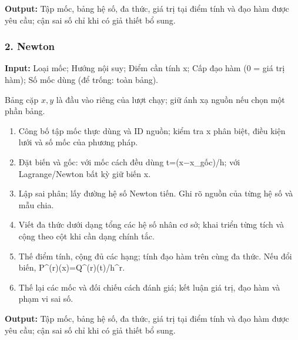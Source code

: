\textbf{Output:} Tập mốc,\allowbreak{} bảng hệ số,\allowbreak{} đa thức,\allowbreak{} giá trị tại điểm tính và đạo hàm được yêu cầu;\allowbreak{} cận sai số chỉ khi có giả thiết bổ sung.

\examplebreak\subsubsection*{2. Newton}

\textbf{Input:} Loại mốc;\allowbreak{} Hướng nội suy;\allowbreak{} Điểm cần tính x;\allowbreak{} Cấp đạo hàm (\allowbreak{}0 =\allowbreak{} giá trị hàm);\allowbreak{} Số mốc dùng (\allowbreak{}để trống: toàn bảng).

Bảng cặp $x,y$ là đầu vào riêng của lượt chạy; giữ ánh xạ nguồn nếu chọn một phần bảng.

\begin{enumerate}

\item Công bố tập mốc thực dùng và ID nguồn;\allowbreak{} kiểm tra x phân biệt,\allowbreak{} điều kiện lưới và số mốc của phương pháp.

\item Đặt biến và gốc: với mốc cách đều dùng t=\allowbreak{}(\allowbreak{}x\ensuremath{-}x\_gốc)/\allowbreak{}h;\allowbreak{} với Lagrange/\allowbreak{}Newton bất kỳ giữ biến x.

\item Lập sai phân;\allowbreak{} lấy đường hệ số Newton tiến. Ghi rõ nguồn của từng hệ số và mẫu chia.

\item Viết đa thức dưới dạng tổng các hệ số nhân cơ sở;\allowbreak{} khai triển từng tích và cộng theo cột khi cần dạng chính tắc.

\item Thế điểm tính,\allowbreak{} cộng đủ các hạng;\allowbreak{} tính đạo hàm trên cùng đa thức. Nếu đổi biến,\allowbreak{} P\textasciicircum{}(\allowbreak{}r)(\allowbreak{}x)=\allowbreak{}Q\textasciicircum{}(\allowbreak{}r)(\allowbreak{}t)/\allowbreak{}h\textasciicircum{}r.

\item Thế lại các mốc và đối chiếu cách đánh giá;\allowbreak{} kết luận giá trị,\allowbreak{} đạo hàm và phạm vi sai số.

\end{enumerate}

\textbf{Output:} Tập mốc,\allowbreak{} bảng hệ số,\allowbreak{} đa thức,\allowbreak{} giá trị tại điểm tính và đạo hàm được yêu cầu;\allowbreak{} cận sai số chỉ khi có giả thiết bổ sung.

